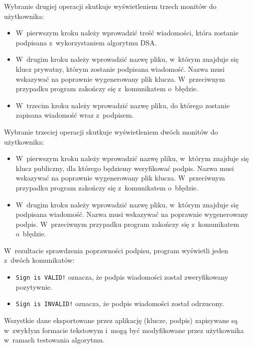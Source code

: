 \documentclass{article}
\begin{document}
            Wybranie drugiej operacji skutkuje wyświetleniem trzech monitów do użytkownika:
            
            \begin{itemize}
                \item W~pierwszym kroku należy wprowadzić treść wiadomości, która zostanie podpisana z~wykorzystaniem algorytmu DSA.
                \item W~drugim kroku należy wprowadzić nazwę pliku, w~którym znajduje się klucz prywatny, którym zostanie podpisana wiadomość. Nazwa musi wskazywać na poprawnie wygenerowany plik klucza. W~przeciwnym przypadku program zakończy się z~komunikatem o~błędzie.
                \item W~trzecim kroku należy wprowadzić nazwę pliku, do którego zostanie zapisana wiadomość wraz z~podpisem.
            \end{itemize}

            Wybranie trzeciej operacji skutkuje wyświetleniem dwóch monitów do użytkownika:
            
            \begin{itemize}
                \item W~pierwszym kroku należy wprowadzić nazwę pliku, w~którym znajduje się klucz publiczny, dla którego będziemy weryfikować podpis. Nazwa musi wskazywać na poprawnie wygenerowany plik klucza. W~przeciwnym przypadku program zakończy się z~komunikatem o~błędzie.
                \item W~drugim kroku należy wprowadzić nazwę pliku, w~którym znajduje się podpisana wiadomość. Nazwa musi wskazywać na poprawnie wygenerowany podpis. W~przeciwnym przypadku program zakończy się z~komunikatem o~błędzie.
            \end{itemize}
            
            W~rezultacie sprawdzenia poprawności podpisu, program wyświetli jeden z~dwóch komunikatów:
            
            \begin{itemize}
                \item \verb+Sign is VALID!+ oznacza, że podpis wiadomości został zweryfikowany pozytywnie.
                \item \verb+Sign is INVALID!+ oznacza, że podpis wiadomości został odrzucony.
            \end{itemize}
     
            Wszystkie dane eksportowane przez aplikację (klucze, podpis) zapisywane są w~zwykłym formacie tekstowym i~mogą być modyfikowane przez użytkownika w~ramach testowania algorytmu.
        
\end{document}
